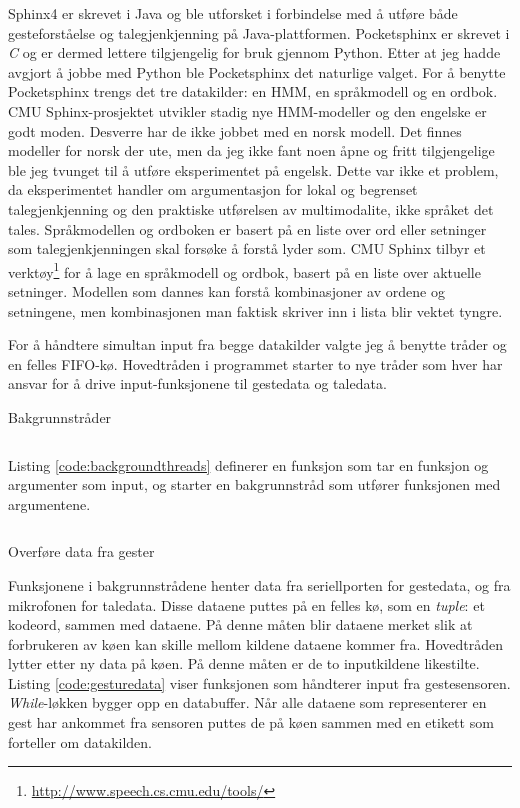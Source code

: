 Sphinx4 er skrevet i Java og ble utforsket i forbindelse med å utføre både gesteforståelse og talegjenkjenning på Java-plattformen. Pocketsphinx er skrevet i \emph{C} og er dermed lettere tilgjengelig for bruk gjennom Python. Etter at jeg hadde avgjort å jobbe med Python ble Pocketsphinx det naturlige valget. For å benytte Pocketsphinx trengs det tre datakilder: en HMM, en språkmodell og en ordbok. CMU Sphinx-prosjektet utvikler stadig nye HMM-modeller og den engelske er godt moden. Desverre har de ikke jobbet med en norsk modell. Det finnes modeller for norsk der ute, men da jeg ikke fant noen åpne og fritt tilgjengelige ble jeg tvunget til å utføre eksperimentet på engelsk. Dette var ikke et problem, da eksperimentet handler om argumentasjon for lokal og begrenset talegjenkjenning og den praktiske utførelsen av multimodalite, ikke språket det tales. Språkmodellen og ordboken er basert på en liste over ord eller setninger som talegjenkjenningen skal forsøke å forstå lyder som. CMU Sphinx tilbyr et verktøy\footnote{\url{http://www.speech.cs.cmu.edu/tools/}} for å lage en språkmodell og ordbok, basert på en liste over aktuelle setninger. Modellen som dannes kan forstå kombinasjoner av ordene og setningene, men kombinasjonen man faktisk skriver inn i lista blir vektet tyngre.

For å håndtere simultan input fra begge datakilder valgte jeg å benytte tråder og en felles FIFO-kø. Hovedtråden i programmet starter to nye tråder som hver har ansvar for å drive input-funksjonene til gestedata og taledata. 
\begin{listing}[ht]
\caption{Bakgrunnstråder}
\inputminted[fontsize=\footnotesize, linenos]{python}{kodesnutter/background_threads.py}
\label{code:backgroundthreads}
\end{listing}
Listing \ref{code:backgroundthreads} definerer en funksjon som tar en funksjon og argumenter som input, og starter en bakgrunnstråd som utfører funksjonen med argumentene.
\begin{listing}[ht]
\inputminted[fontsize=\footnotesize, linenos]{python}{kodesnutter/gesture_data.py}
\label{code:gesturedata}
\caption{Overføre data fra gester}
\end{listing}
Funksjonene i bakgrunnstrådene henter data fra seriellporten for gestedata, og fra mikrofonen for taledata. Disse dataene puttes på en felles kø, som en \emph{tuple}: et kodeord, sammen med dataene. På denne måten blir dataene merket slik at forbrukeren av køen kan skille mellom kildene dataene kommer fra. Hovedtråden lytter etter ny data på køen. På denne måten er de to inputkildene likestilte. Listing \ref{code:gesturedata} viser funksjonen som håndterer input fra gestesensoren. \emph{While}-løkken bygger opp en databuffer. Når alle dataene som representerer en gest har ankommet fra sensoren puttes de på køen sammen med en etikett som forteller om datakilden.

